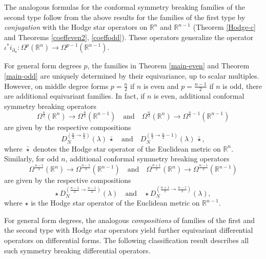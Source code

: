 \documentclass[a4paper,12pt,reqno]{amsart}
\numberwithin{theorem}{subsection}
\numberwithin{equation}{section}
\begin{document}
The analogous formulas for the conformal symmetry breaking families of the
second type follow from the above results for the families of the first type by
{\em conjugation} with the Hodge star operators on ${\mathbb{R}}^n$ and ${\mathbb{R}}^{n-1}$
(Theorem \ref{Hodge-c} and Theorems \ref{coeffeven2}, \ref{coeffodd}). These
operators generalize the operator $\iota^* i_{\partial_n}: \Omega^p({\mathbb{R}}^n) \to
\Omega^{p-1}({\mathbb{R}}^{n-1})$.

For general form degrees $p$, the families in Theorem \ref{main-even} and
Theorem \ref{main-odd} are uniquely determined by their equivariance, up to
scalar multiples. However, on middle degree forms $p=\frac{n}{2}$ if $n$ is
even and $p=\frac{n-1}{2}$ if $n$ is odd, there are additional equivariant
families. In fact, if $n$ is even, additional conformal symmetry breaking
operators
$$
   \Omega^{\frac{n}{2}}({\mathbb{R}}^n) \to \Omega^{\frac{n}{2}}({\mathbb{R}}^{n-1}) \quad \mbox{and}
   \quad \Omega^{\frac{n}{2}}({\mathbb{R}}^n) \to \Omega^{\frac{n}{2}-1}({\mathbb{R}}^{n-1})
$$
are given by the respective compositions
\begin{equation}\label{add-1}
   D_N^{(\frac{n}{2} \to \frac{n}{2})}(\lambda) \, \bar{\star} \quad \mbox{and} \quad
   D_N^{(\frac{n}{2} \to \frac{n}{2}-1)}(\lambda) \, \bar{\star},
\end{equation}
where $\bar{\star}$ denotes the Hodge star operator of the Euclidean metric on
${\mathbb{R}}^n$. Similarly, for odd $n$, additional conformal symmetry breaking
operators
$$
   \Omega^{\frac{n-1}{2}}({\mathbb{R}}^n) \to \Omega^{\frac{n-1}{2}}({\mathbb{R}}^{n-1}) \quad
   \mbox{and} \quad \Omega^{\frac{n+1}{2}}({\mathbb{R}}^n) \to \Omega^{\frac{n-1}{2}}({\mathbb{R}}^{n-1})
$$
are given by the respective compositions
\begin{equation}\label{add-2}
   \star \, D_N^{(\frac{n-1}{2} \to \frac{n-1}{2})}(\lambda) \quad \mbox{and} \quad
   \star D_N^{(\frac{n+1}{2} \to \frac{n-1}{2})}(\lambda),
\end{equation}
where $\star$ is the Hodge star operator of the Euclidean metric on ${\mathbb{R}}^{n-1}$.

For general form degrees, the analogous {\em compositions} of families of the
first and the second type with Hodge star operators yield further equivariant
differential operators on differential forms. The following classification
result describes all such symmetry breaking differential operators.
\end{document}
